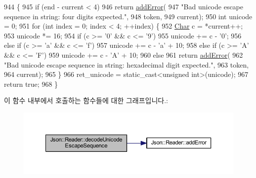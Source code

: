 \begin{DoxyCode}
944                                                                     \{
945   \textcolor{keywordflow}{if} (end - current < 4)
946     \textcolor{keywordflow}{return} \hyperlink{class_json_1_1_reader_af02176a1d2786b4415bbb00a1b10bb6b}{addError}(
947         \textcolor{stringliteral}{"Bad unicode escape sequence in string: four digits expected."},
948         token,
949         current);
950   \textcolor{keywordtype}{int} unicode = 0;
951   \textcolor{keywordflow}{for} (\textcolor{keywordtype}{int} index = 0; index < 4; ++index) \{
952     \hyperlink{class_json_1_1_reader_a3eec9118f3e9a672ba8348c3a79d0f45}{Char} c = *current++;
953     unicode *= 16;
954     \textcolor{keywordflow}{if} (c >= \textcolor{charliteral}{'0'} && c <= \textcolor{charliteral}{'9'})
955       unicode += c - \textcolor{charliteral}{'0'};
956     \textcolor{keywordflow}{else} \textcolor{keywordflow}{if} (c >= \textcolor{charliteral}{'a'} && c <= \textcolor{charliteral}{'f'})
957       unicode += c - \textcolor{charliteral}{'a'} + 10;
958     \textcolor{keywordflow}{else} \textcolor{keywordflow}{if} (c >= \textcolor{charliteral}{'A'} && c <= \textcolor{charliteral}{'F'})
959       unicode += c - \textcolor{charliteral}{'A'} + 10;
960     \textcolor{keywordflow}{else}
961       \textcolor{keywordflow}{return} \hyperlink{class_json_1_1_reader_af02176a1d2786b4415bbb00a1b10bb6b}{addError}(
962           \textcolor{stringliteral}{"Bad unicode escape sequence in string: hexadecimal digit expected."},
963           token,
964           current);
965   \}
966   ret\_unicode = \textcolor{keyword}{static\_cast<}\textcolor{keywordtype}{unsigned} \textcolor{keywordtype}{int}\textcolor{keyword}{>}(unicode);
967   \textcolor{keywordflow}{return} \textcolor{keyword}{true};
968 \}
\end{DoxyCode}
이 함수 내부에서 호출하는 함수들에 대한 그래프입니다.\+:\nopagebreak
\begin{figure}[H]
\begin{center}
\leavevmode
\includegraphics[width=350pt]{class_json_1_1_reader_a469cb6f55971d7c41fca2752a3aa5bf7_cgraph}
\end{center}
\end{figure}
